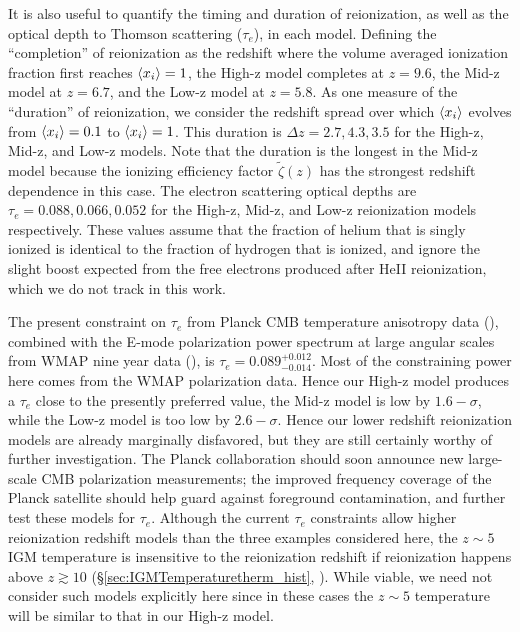 It is also useful to quantify the timing and duration of reionization, as well as the optical depth to Thomson scattering ($\tau_e$), in each model. 
Defining the ``completion'' of reionization as the redshift where the volume averaged ionization fraction first reaches $\langle x_i \rangle =1$,
the High-z model completes at $z=9.6$,
the Mid-z model at $z=6.7$, and the Low-z model at $z=5.8$. As one measure of the ``duration'' of reionization, we consider the redshift spread over which $\langle x_i \rangle$ evolves from
$\langle x_i \rangle=0.1$ to $\langle x_i \rangle = 1$. This duration is $\Delta z = 2.7, 4.3, 3.5$ for the High-z, Mid-z, and Low-z models. Note that the duration
is the longest in the Mid-z model because the ionizing efficiency factor $\tilde{\zeta}(z)$ has the strongest redshift dependence in this case. 
The electron scattering optical depths are $\tau_e = 0.088, 0.066, 0.052$ for the High-z, Mid-z, and Low-z reionization
models respectively. These values assume that the fraction of helium that is singly ionized is identical to the fraction of hydrogen that
is ionized, and ignore the slight boost expected from the free
electrons produced after HeII reionization, which we do not track in this work. 

The present constraint on $\tau_e$ from Planck CMB temperature anisotropy data (\citealt{Ade:2013zuv}), combined with the E-mode polarization power spectrum
at large angular scales from WMAP nine year data (\citealt{Bennett:2012zja}), is $\tau_e = 0.089^{+0.012}_{-0.014}$. Most of the constraining power here
comes from the WMAP polarization data. Hence our High-z model produces a $\tau_e$ close to the presently preferred value, the Mid-z model is low by $1.6-\sigma$, while the Low-z model is too low by $2.6-\sigma$. Hence our lower redshift reionization models are already marginally
disfavored, but they are still certainly worthy of further investigation. The Planck collaboration should soon announce new large-scale CMB
polarization measurements; the improved frequency coverage of the Planck satellite should help guard against foreground contamination, and
further test these models for $\tau_e$.
Although the current $\tau_e$ constraints allow higher reionization redshift models than the three
examples considered here, the $z \sim 5$ IGM temperature is insensitive to the reionization redshift
if reionization happens above $z \gtrsim 10$ (\S \ref{sec:IGMTemperaturetherm_hist}, \citealt{Hui:2003hn}). While viable, we need not consider such models 
explicitly here since in these cases the $z \sim 5$ temperature will be similar to that in our High-z model.


